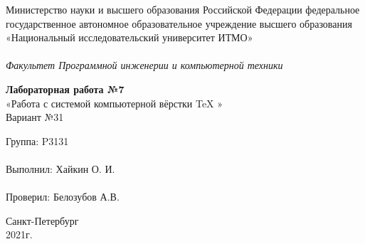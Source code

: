 \documentclass[../main.tex]{subfiles}
\begin{document}
\begin{center}
\fontsize{14pt}{10pt}\selectfont
\linespread{1.3}
Министерство науки и высшего образования Российской Федерации
федеральное государственное автономное образовательное учреждение высшего образования 
«Национальный исследовательский университет ИТМО» \\
~\\
\textit{Факультет Программной инженерии и компьютерной техники}
\vspace{5cm}
\fontsize{18pt}{10pt}\selectfont

\textbf{Лабораторная работа №7} \\
«Работа с системой компьютерной вёрстки TeX » \\
Вариант №31
\end{center}
\vspace{5cm}
\fontsize{14pt}{10pt}\selectfont
\begin{flushright}
Группа: P3131 ~~~~~~~~~~~~~~~~ \\
~\\
Выполнил: Хайкин О. И. ~\\
~\\
Проверил: Белозубов А.В.
\end{flushright}
\vspace{2cm}
\begin{center}
Санкт-Петербург \\
2021г.
\end{center}
\restoregeometry
\end{document}
